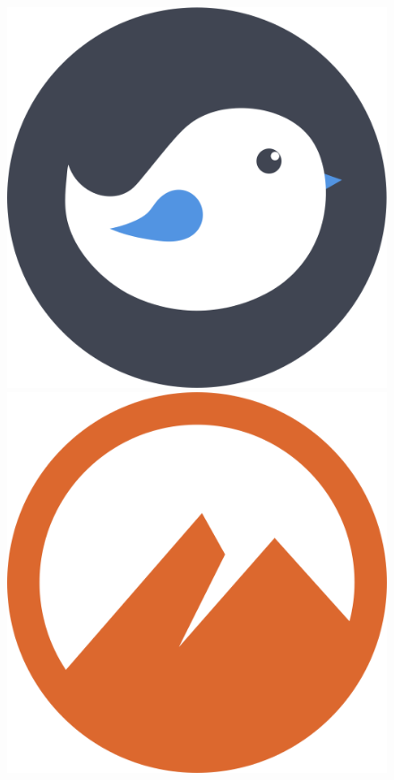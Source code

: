\begin{figure}[ht!]
	\centering
	\includegraphics[width=0.2\paperwidth]{./img/desktops/budgie}
	\includegraphics[width=0.2\paperwidth]{./img/desktops/cinnamon}

\end{figure}
